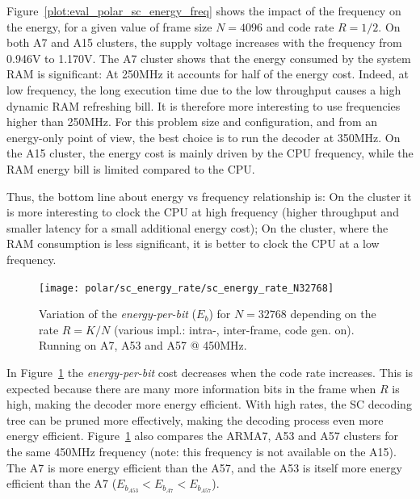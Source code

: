 Figure~\ref{plot:eval_polar_sc_energy_freq} shows the impact of the frequency on
the energy, for a given value of frame size $N=4096$ and code rate $R=1/2$. On
both A7 and A15 clusters, the supply voltage increases with the frequency from
0.946V to 1.170V. The A7 \little cluster shows that the energy consumed by the
system RAM is significant: At 250MHz it accounts for half of the energy cost.
Indeed, at low frequency, the long execution time due to the low throughput
causes a high dynamic RAM refreshing bill. It is therefore more interesting to
use frequencies higher than 250MHz. For this problem size and configuration, and
from an energy-only point of view, the best choice is to run the decoder at
350MHz. On the A15 \big cluster, the energy cost is mainly driven by the CPU
frequency, while the RAM energy bill is limited compared to the CPU.

Thus, the bottom line about energy vs frequency relationship is: On the \little
cluster it is more interesting to clock the CPU at high frequency (higher
throughput and smaller latency for a small additional energy cost); On the
\big cluster, where the RAM consumption is less significant, it is better to
clock the CPU at a low frequency.

\begin{figure}
  \centering
  \texttt{[image: polar/sc\_energy\_rate/sc\_energy\_rate\_N32768]}
  \caption{Variation of the \emph{energy-per-bit} ($E_b$) for $N = 32768$
    depending on the rate $R = K / N$ (various impl.: intra-, inter-frame, code
    gen. on). Running on A7, A53 and A57 @ 450MHz.}
  \label{plot:eval_polar_sc_energy_rate}
\end{figure}

In Figure~\ref{plot:eval_polar_sc_energy_rate} the \emph{energy-per-bit} cost
decreases when the code rate increases. This is expected because there are many
more information bits in the frame when $R$ is high, making the decoder more
energy efficient. With high rates, the SC decoding tree can be pruned more
effectively, making the decoding process even more energy efficient.
Figure~\ref{plot:eval_polar_sc_energy_rate} also compares the ARM\R A7, A53 and
A57 clusters for the same 450MHz frequency (note: this frequency is not
available on the A15). The \little A7 is more energy efficient than the \big
A57, and the \little A53 is itself more energy efficient than the \little A7
($E_{b_{A53}} < E_{b_{A7}} < E_{b_{A57}}$).


